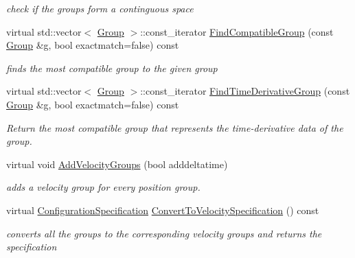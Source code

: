 \begin{DoxyCompactItemize}
\begin{DoxyCompactList}\small\item\em check if the groups form a continguous space \item\end{DoxyCompactList}\item 
virtual std::vector$<$ \hyperlink{classOpenRAVE_1_1ConfigurationSpecification_1_1Group}{Group} $>$::const\_\-iterator \hyperlink{classOpenRAVE_1_1ConfigurationSpecification_a188304abf23d571f0f340adfdd28e3f0}{FindCompatibleGroup} (const \hyperlink{classOpenRAVE_1_1ConfigurationSpecification_1_1Group}{Group} \&g, bool exactmatch=false) const 
\begin{DoxyCompactList}\small\item\em finds the most compatible group to the given group \item\end{DoxyCompactList}\item 
virtual std::vector$<$ \hyperlink{classOpenRAVE_1_1ConfigurationSpecification_1_1Group}{Group} $>$::const\_\-iterator \hyperlink{classOpenRAVE_1_1ConfigurationSpecification_abbad5fc78067a778c4f95cf170b03c80}{FindTimeDerivativeGroup} (const \hyperlink{classOpenRAVE_1_1ConfigurationSpecification_1_1Group}{Group} \&g, bool exactmatch=false) const 
\begin{DoxyCompactList}\small\item\em Return the most compatible group that represents the time-\/derivative data of the group. \item\end{DoxyCompactList}\item 
virtual void \hyperlink{classOpenRAVE_1_1ConfigurationSpecification_a87498a23beea02e83fd8ddc062898cb3}{AddVelocityGroups} (bool adddeltatime)
\begin{DoxyCompactList}\small\item\em adds a velocity group for every position group. \item\end{DoxyCompactList}\item 
virtual \hyperlink{classOpenRAVE_1_1ConfigurationSpecification}{ConfigurationSpecification} \hyperlink{classOpenRAVE_1_1ConfigurationSpecification_a1f02e17eb90a72326f6a479c7747c9c8}{ConvertToVelocitySpecification} () const 
\begin{DoxyCompactList}\small\item\em converts all the groups to the corresponding velocity groups and returns the specification \item\end{DoxyCompactList}\item 

\end{DoxyCompactItemize}
